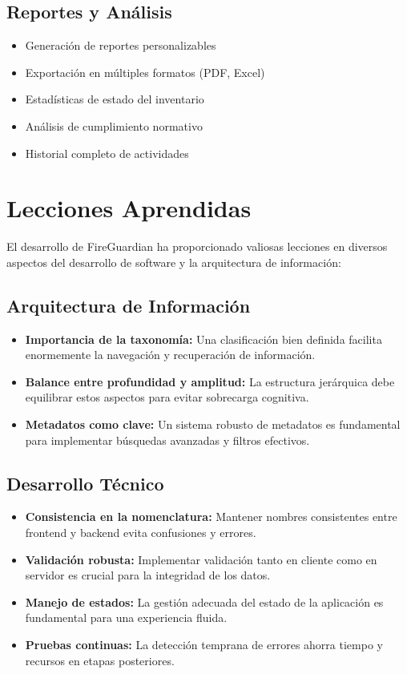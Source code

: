 \documentclass[11pt,a4paper]{article}
\begin{document}
\subsection{Reportes y Análisis}

\begin{itemize}
    \item Generación de reportes personalizables
    \item Exportación en múltiples formatos (PDF, Excel)
    \item Estadísticas de estado del inventario
    \item Análisis de cumplimiento normativo
    \item Historial completo de actividades
\end{itemize}

\section{Lecciones Aprendidas}

El desarrollo de FireGuardian ha proporcionado valiosas lecciones en diversos aspectos del desarrollo de software y la arquitectura de información:

\subsection{Arquitectura de Información}

\begin{itemize}
    \item \textbf{Importancia de la taxonomía:} Una clasificación bien definida facilita enormemente la navegación y recuperación de información.
    \item \textbf{Balance entre profundidad y amplitud:} La estructura jerárquica debe equilibrar estos aspectos para evitar sobrecarga cognitiva.
    \item \textbf{Metadatos como clave:} Un sistema robusto de metadatos es fundamental para implementar búsquedas avanzadas y filtros efectivos.
\end{itemize}

\subsection{Desarrollo Técnico}

\begin{itemize}
    \item \textbf{Consistencia en la nomenclatura:} Mantener nombres consistentes entre frontend y backend evita confusiones y errores.
    \item \textbf{Validación robusta:} Implementar validación tanto en cliente como en servidor es crucial para la integridad de los datos.
    \item \textbf{Manejo de estados:} La gestión adecuada del estado de la aplicación es fundamental para una experiencia fluida.
    \item \textbf{Pruebas continuas:} La detección temprana de errores ahorra tiempo y recursos en etapas posteriores.
\end{itemize}
\end{document}
